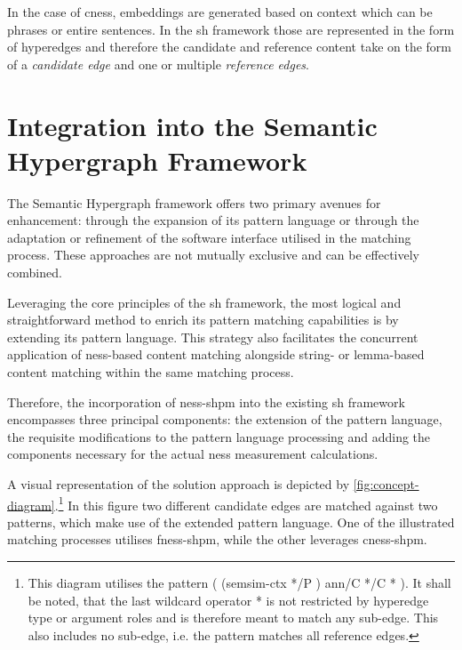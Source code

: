 \documentclass[11pt]{scrreprt}
\begin{document}
In the case of \gls{cness}, embeddings are generated based on context which can be phrases or entire sentences. In the \gls{sh} framework those are represented in the form of hyperedges and therefore the candidate and reference content take on the form of a \textit{candidate edge} and one or multiple \textit{reference edges}. 

\section{Integration into the Semantic Hypergraph Framework}

The Semantic Hypergraph framework offers two primary avenues for enhancement: through the expansion of its pattern language or through the adaptation or refinement of the software interface utilised in the matching process. These approaches are not mutually exclusive and can be effectively combined.

Leveraging the core principles of the \gls{sh} framework, the most logical and straightforward method to enrich its pattern matching capabilities is by extending its pattern language. This strategy also facilitates the concurrent application of \gls{ness}-based content matching alongside string- or lemma-based content matching within the same matching process.

Therefore, the incorporation of \gls{ness-shpm} into the existing \gls{sh} framework encompasses three principal components: the extension of the pattern language, the requisite modifications to the pattern language processing and adding the components necessary for the actual \gls{ness} measurement calculations.


A visual representation of the solution approach is depicted by \cref{fig:concept-diagram}.\footnote{This diagram utilises the pattern \textsf{( (semsim-ctx */P ) ann/C */C * )}. It shall be noted, that the last wildcard operator \textsf{*} is not restricted by hyperedge type or argument roles and is therefore meant to match any sub-edge. This also includes no sub-edge, i.e. the pattern matches all reference edges.} In this figure two different candidate edges are matched against two patterns, which make use of the extended pattern language. One of the illustrated matching processes utilises \gls{fness-shpm}, while the other leverages \gls{cness-shpm}.
\end{document}
